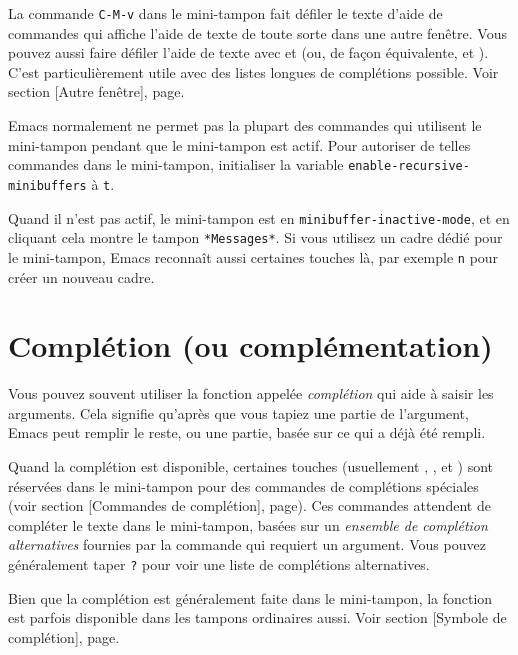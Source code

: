 La commande \texttt{C-M-v} dans le mini-tampon fait défiler le texte
d'aide de commandes qui affiche l'aide de texte de toute sorte
dans une autre fenêtre. Vous pouvez aussi faire défiler l'aide de
texte avec  et  (ou, de façon
équivalente,  et ). C'est
particulièrement utile avec des listes longues de complétions
possible. Voir section [Autre fenêtre],
page.\par

Emacs normalement ne permet pas la plupart des commandes qui utilisent
le mini-tampon pendant que le mini-tampon est actif. Pour autoriser de
telles commandes dans le mini-tampon, initialiser la variable
\texttt{enable-recursive-minibuffers} à \texttt{t}.\par

Quand il n'est pas actif, le mini-tampon est en
\texttt{minibuffer-inactive-mode}, et en cliquant 
cela montre le tampon \texttt{*Messages*}. Si vous utilisez un cadre
dédié pour le mini-tampon, Emacs reconnaît aussi certaines touches là,
par exemple \texttt{n} pour créer un nouveau cadre.\par


\section{Complétion (ou complémentation)}
Vous pouvez souvent utiliser la fonction appelée \emph{complétion} qui
aide à saisir les arguments. Cela signifie qu'après que vous tapiez
une partie de l'argument, Emacs peut remplir le reste, ou une partie,
basée sur ce qui a déjà été rempli.\par

Quand la complétion est disponible, certaines touches (usuellement
\TAB, \RET, et \SPC) sont réservées dans le mini-tampon
pour des commandes de complétions spéciales (voir
section [Commandes de complétion],
page). Ces commandes attendent de compléter le texte
dans le mini-tampon, basées sur un \emph{ensemble de complétion
  alternatives} fournies par la commande qui requiert un
argument. Vous pouvez généralement taper \texttt{?} pour voir une
liste de complétions alternatives.\par

Bien que la complétion est généralement faite dans le mini-tampon, la
fonction est parfois disponible dans les tampons ordinaires
aussi. Voir section [Symbole de complétion],
page.\par

